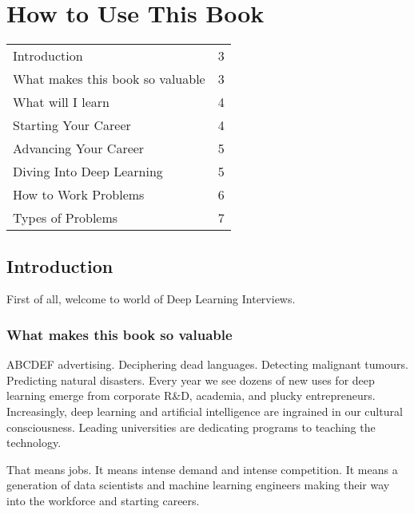 \documentclass{book}
\begin{document}
\chapter{How to Use This Book}

\vspace{-0.5em}

\vspace{0.5em}
\noindent\begin{tabular}{@{}L{0.9\textwidth}@{\dotfill}R{0.05\textwidth}@{}}
Introduction & 3 \\
What makes this book so valuable & 3 \\
What will I learn & 4 \\
\hspace{0.5cm}Starting Your Career & 4 \\
\hspace{0.5cm}Advancing Your Career & 5 \\
\hspace{0.5cm}Diving Into Deep Learning & 5 \\
How to Work Problems & 6 \\
Types of Problems & 7 \\
\end{tabular}

\vspace{1em}
\section{Introduction}
First of all, welcome to world of Deep Learning Interviews.

\subsection{What makes this book so valuable}
ABCDEF advertising. Deciphering dead languages. Detecting malignant tumours. Predicting natural disasters. Every year we see dozens of new uses for deep learning emerge from corporate R\&D, academia, and plucky entrepreneurs. Increasingly, deep learning and artificial intelligence are ingrained in our cultural consciousness. Leading universities are dedicating programs to teaching the technology.

That means jobs. It means intense demand and intense competition. It means a generation of data scientists and machine learning engineers making their way into the workforce and starting careers.
\end{document}
